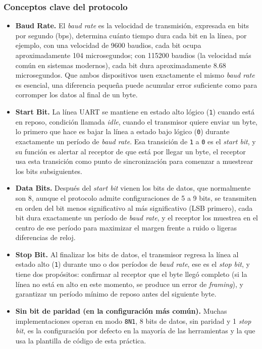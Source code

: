 \documentclass[12pt,letterpaper]{article}
\begin{document}
\subsubsection*{Conceptos clave del protocolo}
\begin{itemize}
\item \textbf{Baud Rate.}
  El \textit{baud rate} es la velocidad de transmisión, expresada en bits por segundo (bps), determina cuánto
  tiempo dura cada bit en la línea, por ejemplo, con una velocidad de 9600 baudios, cada bit ocupa
  aproximadamente 104 microsegundos; con 115200 baudios (la velocidad más común en sistemas modernos), cada bit
  dura aproximadamente 8.68 microsegundos. Que ambos dispositivos usen exactamente el mismo \textit{baud rate} es
  esencial, una diferencia pequeña puede acumular error suficiente como para corromper los datos al final de un
  byte.\\
  
\item \textbf{Start Bit.}
  La línea UART se mantiene en estado alto lógico (\texttt{1}) cuando está en reposo, condición llamada
  \textit{idle}, cuando el transmisor quiere enviar un byte, lo primero que hace es bajar la línea a estado bajo
  lógico (\texttt{0}) durante exactamente un período de \textit{baud rate}. Esa transición de \texttt{1} a
  \texttt{0} es el \textit{start bit}, y su función es alertar al receptor de que está por llegar un byte, el
  receptor usa esta transición como punto de sincronización para comenzar a muestrear los bits subsiguientes.\\

\item \textbf{Data Bits.}
  Después del \textit{start bit} vienen los bits de datos, que normalmente son 8, aunque el protocolo admite
  configuraciones de 5 a 9 bits, se transmiten en orden del bit menos significativo al más significativo
  (LSB primero), cada bit dura exactamente un período de \textit{baud rate}, y el receptor los muestrea en el
  centro de ese período para maximizar el margen frente a ruido o ligeras diferencias de reloj.\\
  
\item \textbf{Stop Bit.}
  Al finalizar los bits de datos, el transmisor regresa la línea al estado alto (\texttt{1}) durante uno o dos
  períodos de \textit{baud rate}, ese es el \textit{stop bit}, y tiene dos propósitos: confirmar al receptor que
  el byte llegó completo (si la línea no está en alto en este momento, se produce un error de \textit{framing}),
  y garantizar un período mínimo de reposo antes del siguiente byte.\\
  
\item \textbf{Sin bit de paridad (en la configuración más común).}
  Muchas implementaciones operan en modo \texttt{8N1}, 8 bits de datos, sin paridad y 1 \textit{stop bit}, es la
  configuración por defecto en la mayoría de las herramientas y la que usa la plantilla de código de esta
  práctica.
\end{itemize}
\end{document}
